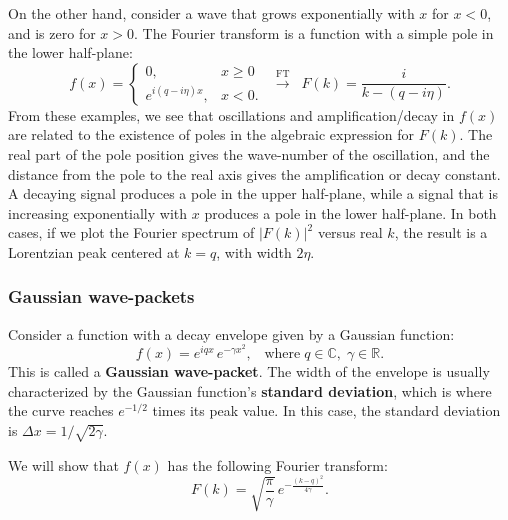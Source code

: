 \documentclass[10pt,a4paper]{article}
\begin{document}
On the other hand, consider a wave that grows exponentially with $x$
for $x < 0$, and is zero for $x > 0$. The Fourier transform is a
function with a simple pole in the lower half-plane:
\begin{equation}
f(x) = \left\{\begin{array}{cl}0, & x \ge 0 \\ e^{i (q - i\eta) x}, & x < 0.\end{array}\right. \;\;  \overset{\mathrm{FT}}{\longrightarrow} \;\; F(k) = \frac{i}{k-(q - i\eta)}.
\end{equation}
From these examples, we see that oscillations and amplification/decay
in $f(x)$ are related to the existence of poles in the algebraic
expression for $F(k)$. The real part of the pole position gives the
wave-number of the oscillation, and the distance from the pole to the
real axis gives the amplification or decay constant. A decaying signal
produces a pole in the upper half-plane, while a signal that is
increasing exponentially with $x$ produces a pole in the lower
half-plane. In both cases, if we plot the Fourier spectrum of
$|F(k)|^2$ versus real $k$, the result is a Lorentzian peak centered
at $k = q$, with width $2\eta$.

\subsubsection{Gaussian wave-packets}
\label{gaussian-wave-packets}

Consider a function with a decay envelope given by a Gaussian
function:
\begin{equation}
f(x) = e^{iq x} \, e^{-\gamma x^2}, \;\;\;\mathrm{where}\; q \in \mathbb{C},\; \gamma \in \mathbb{R}.
\end{equation}
This is called a \textbf{Gaussian wave-packet}. The width of the
envelope is usually characterized by the Gaussian function's
\textbf{standard deviation}, which is where the curve reaches
$e^{-1/2}$ times its peak value. In this case, the standard deviation
is $\Delta x = 1/\sqrt{2\gamma}$.

We will show that $f(x)$ has the following Fourier transform:
\begin{equation}
F(k) = \sqrt{\frac{\pi}{\gamma}} \, e^{-\frac{(k-q)^2}{4\gamma}}.
\end{equation}
\end{document}
